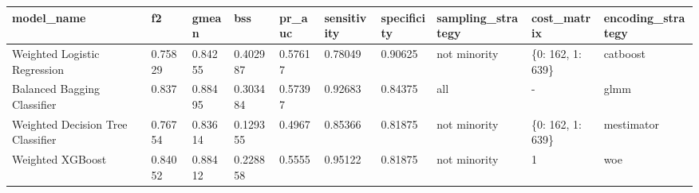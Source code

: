 \begin{tabular}{|l|l|l|l|l|l|l|l|l|l|}
\hline
\textbf{model\_name}              & \textbf{f2} & \textbf{gmean} & \textbf{bss} & \textbf{pr\_auc} & \textbf{sensitivity} & \textbf{specificity} & \textbf{sampling\_strategy} & \textbf{cost\_matrix} & \textbf{encoding\_strategy} \\ \hline
Weighted Logistic Regression      & 0.75829     & 0.84255        & 0.402987     & 0.57617          & 0.78049              & 0.90625              & not minority                & \{0: 162, 1: 639\}    & catboost                    \\ \hline
Balanced Bagging Classifier       & 0.837       & 0.88495        & 0.303484     & 0.57397          & 0.92683              & 0.84375              & all                         & -                     & glmm                        \\ \hline
Weighted Decision Tree Classifier & 0.76754     & 0.83614        & 0.129355     & 0.4967           & 0.85366              & 0.81875              & not minority                & \{0: 162, 1: 639\}    & mestimator                  \\ \hline
Weighted XGBoost                  & 0.84052     & 0.88412        & 0.228858     & 0.5555           & 0.95122              & 0.81875              & not minority                & 1                     & woe                         \\ \hline
\end{tabular}